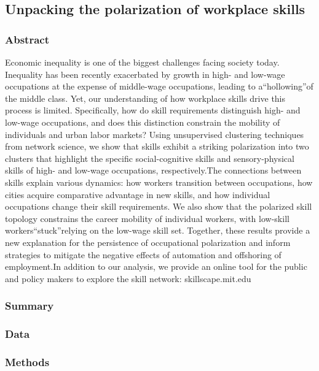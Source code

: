 \documentclass[12pt]{article}
\begin{document}
\subsection*{Unpacking the polarization of workplace skills\cite{unpacking_the_polarization}}

\subsubsection*{Abstract}
Economic inequality is one of the biggest challenges facing society today. Inequality has been recently exacerbated by growth in high- and low-wage occupations at the expense of middle-wage occupations, leading to a“hollowing”of the middle class. Yet, our understanding of how workplace skills drive this process is limited. Specifically, how do skill requirements distinguish high- and low-wage occupations, and does this distinction constrain the mobility of individuals and urban labor markets? Using unsupervised clustering techniques from network science, we show that skills exhibit a striking polarization into two clusters that highlight the specific social-cognitive skills and sensory-physical skills of high- and low-wage occupations, respectively.The connections between skills explain various dynamics: how workers transition between occupations, how cities acquire comparative advantage in new skills, and how individual occupations change their skill requirements. We also show that the polarized skill topology constrains the career mobility of individual workers, with low-skill workers“stuck”relying on the low-wage skill set. Together, these results provide a new explanation for the persistence of occupational polarization and inform strategies to mitigate the negative effects of automation and offshoring of employment.In addition to our analysis, we provide an online tool for the public and policy makers to explore the skill network: skillscape.mit.edu
\subsubsection*{Summary}

\subsubsection*{Data}

\subsubsection*{Methods}


\end{document}
